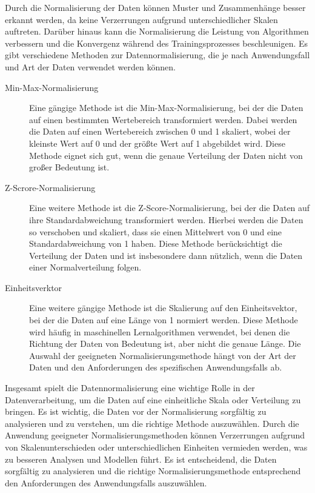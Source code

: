 Durch die Normalisierung der Daten können Muster und Zusammenhänge besser erkannt werden, da keine Verzerrungen aufgrund unterschiedlicher Skalen auftreten. 
Darüber hinaus kann die Normalisierung die Leistung von Algorithmen verbessern und die Konvergenz während des Trainingsprozesses beschleunigen.
Es gibt verschiedene Methoden zur Datennormalisierung, die je nach Anwendungsfall und Art der Daten verwendet werden können.

\begin{description}
    \item[Min-Max-Normalisierung] Eine gängige Methode ist die Min-Max-Normalisierung, bei der die Daten auf einen bestimmten Wertebereich transformiert werden. 
    Dabei werden die Daten auf einen Wertebereich zwischen 0 und 1 skaliert, wobei der kleinste Wert auf 0 und der größte Wert auf 1 abgebildet wird. 
    Diese Methode eignet sich gut, wenn die genaue Verteilung der Daten nicht von großer Bedeutung ist. 
    \item[Z-Scrore-Normalisierung] Eine weitere Methode ist die Z-Score-Normalisierung, bei der die Daten auf ihre Standardabweichung transformiert werden. 
    Hierbei werden die Daten so verschoben und skaliert, dass sie einen Mittelwert von 0 und eine Standardabweichung von 1 haben. 
    Diese Methode berücksichtigt die Verteilung der Daten und ist insbesondere dann nützlich, wenn die Daten einer Normalverteilung folgen.
    \item[Einheitsverktor] Eine weitere gängige Methode ist die Skalierung auf den Einheitsvektor, bei der die Daten auf eine Länge von 1 normiert werden. 
    Diese Methode wird häufig in maschinellen Lernalgorithmen verwendet, bei denen die Richtung der Daten von Bedeutung ist, aber nicht die genaue Länge.
    Die Auswahl der geeigneten Normalisierungsmethode hängt von der Art der Daten und den Anforderungen des spezifischen Anwendungsfalls ab. 
\end{description}

 
    Insgesamt spielt die Datennormalisierung eine wichtige Rolle in der Datenverarbeitung, um die Daten auf eine einheitliche Skala oder Verteilung zu bringen.
    Es ist wichtig, die Daten vor der Normalisierung sorgfältig zu analysieren und zu verstehen, um die richtige Methode auszuwählen.
    Durch die Anwendung geeigneter Normalisierungsmethoden können Verzerrungen aufgrund von Skalenunterschieden oder unterschiedlichen Einheiten vermieden werden, was zu besseren Analysen und Modellen führt. 
    Es ist entscheidend, die Daten sorgfältig zu analysieren und die richtige Normalisierungsmethode entsprechend den Anforderungen des Anwendungsfalls auszuwählen.

